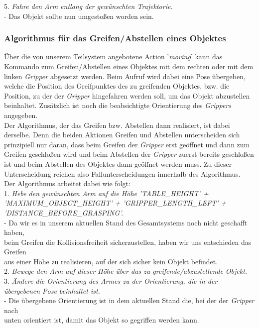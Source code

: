\documentclass{suturo}
\newcommand\tab[1][1cm]{\hspace*{#1}}
\begin{document}
5. \textit{Fahre den Arm entlang der gewünschten Trajektorie.}\\
\tab - Das Objekt sollte nun umgestoßen worden sein.


\subsubsection{Algorithmus für das Greifen/Abstellen eines Objektes}
Über die von unserem Teilsystem angebotene Action '\textit{moving}' kann das Kommando zum Greifen/Abstellen eines Objektes mit dem rechten oder mit dem linken \textit{Gripper} abgesetzt werden. Beim Aufruf wird dabei eine Pose übergeben, welche die Position des Greifpunktes des zu greifenden Objektes, bzw. die Position, zu der der \textit{Gripper} hingefahren werden soll, um das Objekt abzustellen beinhaltet. Zusätzlich ist noch die beabsichtigte Orientierung des \textit{Grippers} angegeben. \\Der Algorithmus, der das Greifen bzw. Abstellen dann realisiert, ist dabei derselbe. Denn die beiden Aktionen Greifen und Abstellen unterscheiden sich prinzipiell nur daran, dass beim Greifen der \textit{Gripper} erst geöffnet und dann zum Greifen geschloßen wird und beim Abstellen der \textit{Gripper} zuerst bereits geschloßen ist und beim Abstellen des Objektes dann geöffnet werden muss. Zu dieser Unterscheidung reichen also Fallunterscheidungen innerhalb des Algorithmus. \\Der Algorithmus arbeitet dabei wie folgt:\\

1. \textit{Hebe den gewünschten Arm auf die Höhe 'TABLE\_HEIGHT' + 'MAXIMUM\_OBJECT\_HEIGHT' + 'GRIPPER\_LENGTH\_LEFT' + 'DISTANCE\_BEFORE\_GRASPING'.}\\
\tab - Da wir es in unserem aktuellen Stand des Gesamtsystems noch nicht geschafft haben, \\ \tab beim Greifen die Kollisionsfreiheit sicherzustellen, haben wir uns entschieden das Greifen\\ \tab aus einer Höhe zu realisieren, auf der sich sicher kein Objekt befindet.\\

2. \textit{Bewege den Arm auf dieser Höhe über das zu greifende/abzustellende Objekt.}\\

3. \textit{Ändere die Orientierung des Armes zu der Orientierung, die in der übergebenen Pose beinhaltet ist.}\\
\tab - Die übergebene Orientierung ist in dem aktuellen Stand die, bei der der \textit{Gripper} nach \\ \tab unten orientiert ist, damit das Objekt so gegriffen werden kann.\\
\end{document}
